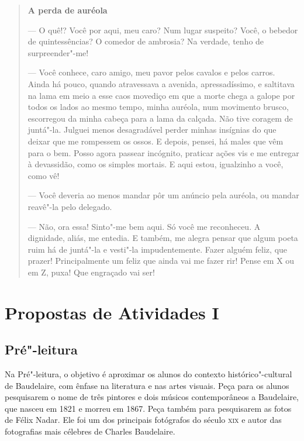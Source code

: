\documentclass[12pt]{extarticle}
\begin{document}
\begin{quote}
{\centering\textbf{A perda de auréola}\par}

--- O quê!? Você por aqui, meu caro? Num lugar suspeito?
Você, o bebedor de quintessências? O comedor de ambrosia? Na
verdade, tenho de surpreender"-me!

--- Você conhece, caro amigo, meu pavor pelos cavalos e pelos carros. Ainda
há pouco, quando atravessava a avenida, apressadíssimo, e
saltitava na lama em meio a esse caos movediço em que a morte chega a
galope por todos os lados ao mesmo tempo, minha auréola, num movimento
brusco, escorregou da minha cabeça para a lama da calçada. Não tive
coragem de juntá"-la. Julguei menos desagradável perder minhas
insígnias do que deixar que me rompessem os ossos. E depois, pensei, há
males que vêm para o bem. Posso agora passear incógnito, praticar ações
vis e me entregar à devassidão, como os simples mortais. E 
aqui estou, igualzinho a você, como vê!

--- Você deveria ao menos mandar pôr um anúncio pela auréola, ou mandar
reavê"-la pelo delegado.

--- Não, ora essa! Sinto"-me bem aqui. Só você me reconheceu. A dignidade, aliás, me entedia. E também, me alegra pensar que algum poeta ruim
há de juntá"-la e vesti"-la impudentemente. Fazer alguém feliz, que
prazer! Principalmente um feliz que ainda vai me fazer rir! Pense em X ou em
Z, puxa! Que engraçado vai ser!

\end{quote}


\section{Propostas de Atividades I}

\subsection{Pré"-leitura}

Na Pré"-leitura, o objetivo é aproximar os alunos do contexto
histórico"-cultural de Baudelaire, com ênfase na literatura e nas artes
visuais. Peça para os alunos pesquisarem o nome de três pintores e 
dois músicos contemporâneos a Baudelaire, que nasceu em 1821 e 
morreu em 1867. Peça também para pesquisarem as fotos de Félix Nadar. Ele foi 
um dos principais fotógrafos do século \textsc{xix} e autor das 
fotografias mais célebres de Charles Baudelaire.  
\end{document}
